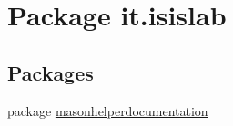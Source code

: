 \hypertarget{namespaceit_1_1isislab}{\section{Package it.\-isislab}
\label{namespaceit_1_1isislab}
}
\subsection*{Packages}
\begin{DoxyCompactItemize}
\item 
package \hyperlink{namespaceit_1_1isislab_1_1masonhelperdocumentation}{masonhelperdocumentation}
\end{DoxyCompactItemize}
